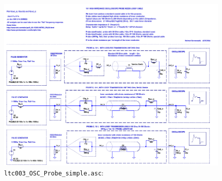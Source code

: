     \begin{figure}
      \centering
      \includegraphics[width=1\linewidth]{../ltspice/ltc002_OSC_Probe.pdf}
      \caption{\texttt{ltc003\_OSC\_Probe\_simple.asc}: }
      \label{SPICE:fig_ltc002_OSC}
    \end{figure}

    

